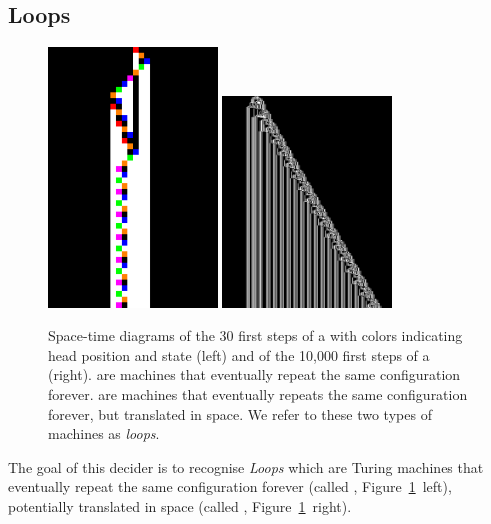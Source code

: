 
\newpage
\subsection{Loops}\label{sec:loops}

\begin{figure}[h!]
  \centering
  \includegraphics[width=0.4\textwidth]{figures/space-time-diagrams/cycler_279081.pdf}
  \hspace{2ex}
  \includegraphics[width=0.4\textwidth]{figures/space-time-diagrams/translated_cycler_59090563_2.png}
  \caption{Space-time diagrams of the 30 first steps of a \textit{\cycler} with colors indicating head position and state (left) and of the 10,000 first steps of a \TC (right). \cyclers are machines that eventually repeat the same configuration forever. \TCs are machines that eventually repeats the same configuration forever, but translated in space. We refer to these two types of machines as \textit{loops}.}\label{fig:loops}
\end{figure}

The goal of this decider is to recognise \textit{Loops} which are Turing machines that eventually repeat the same configuration forever (called \textit{\cyclers}, Figure~\ref{fig:loops}~left), potentially translated in space (called \textit{\TCs}, Figure~\ref{fig:loops}~right).

